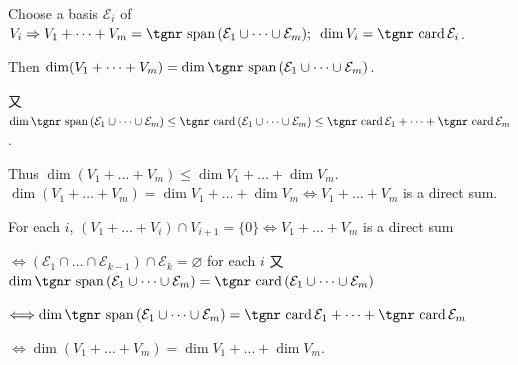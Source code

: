 \documentclass[a4paper, 11pt, UTF8]{article}
\def\card{{\textup{\tgnr card}}\,}
\def\Spn{{\textup{\tgnr span}}\,}
\begin{document}
\begin{large}
\par\quad
Choose a basis $ \mathcal{E}_i$ of $V_i\Rightarrow V_1+\dots+V_m=\Spn( \mathcal{E}_1\cup\cdots\cup \mathcal{E}_m);\,\,\,\dim V_i=\card \mathcal{E}_i$.\par\quad
Then $\dim(V_1+\dots+V_m)=\dim\Spn( \mathcal{E}_1\cup\cdots\cup \mathcal{E}_m)$.\par\quad
又 $\dim\Spn(\mathcal{E}_1\cup\cdots\cup\mathcal{E}_m)\leq\card( \mathcal{E}_1\cup\cdots\cup \mathcal{E}_m)\leq\card \mathcal{E}_1+\cdots+\card \mathcal{E}_m$.\par\quad
Thus $\dim(V_1+\dots+V_m)\leq \dim V_1+\dots+\dim V_m.$\PfEnd\vspace{10pt}\quad
\Comment \,\,\,{\tgsl\Large$\dim(V_1+\dots+V_m)=\dim V_1+\dots+\dim V_m\Longleftrightarrow V_1+\dots+V_m$ is a direct sum.}\par\quad\Blind{\Comment\,\,}
For each $i$, $(V_1+\dots+V_i)\cap V_{i+1}=\{0\}\Longleftrightarrow V_1+\dots+V_m$ is a direct sum\par\quad\Blind{\Comment\,\,}
$\Longleftrightarrow(\mathcal{E}_1\cap\dots\cap\mathcal{E}_{k-1})\cap\mathcal{E}_k=\varnothing$ for each $i$ 又 $\dim\Spn(\mathcal{E}_1\cup\dots\cup\mathcal{E}_m)=\card(\mathcal{E}_1\cup\dots\cup\mathcal{E}_m)$\par\quad\Blind{\Comment\,\,}
$\Longleftrightarrow\dim\Spn(\mathcal{E}_1\cup\dots\cup\mathcal{E}_m)=\card\mathcal{E}_1+\dots+\card\mathcal{E}_m$\par\quad\Blind{\Comment\,\,}
$\Longleftrightarrow\dim(V_1+\dots+V_m)=\dim V_1+\dots+\dim V_m.$\PfEnd
\SepLine


\end{large}
\end{document}
